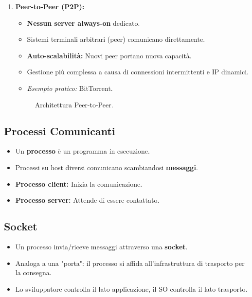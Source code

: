 \begin{enumerate}
    \item \textbf{Peer-to-Peer (P2P):}
    \begin{itemize}
        \item \textbf{Nessun server always-on} dedicato.
        \item Sistemi terminali arbitrari (peer) comunicano direttamente.
        \item \textbf{Auto-scalabilità:} Nuovi peer portano nuova capacità.
        \item Gestione più complessa a causa di connessioni intermittenti e IP dinamici.
        \item \textit{Esempio pratico:} BitTorrent.
    \end{itemize}
\begin{figure}[H]
    \centering
    \caption{Architettura Peer-to-Peer.}
\end{figure}
\end{enumerate}


\subsection{Processi Comunicanti}
\begin{itemize}
    \item Un \textbf{processo} è un programma in esecuzione.
    \item Processi su host diversi comunicano scambiandosi \textbf{messaggi}.
    \item \textbf{Processo client:} Inizia la comunicazione.
    \item \textbf{Processo server:} Attende di essere contattato.
\end{itemize}

\subsection{Socket}
\begin{itemize}
    \item Un processo invia/riceve messaggi attraverso una \textbf{socket}.
    \item Analoga a una "porta": il processo si affida all'infrastruttura di trasporto per la consegna.
    \item Lo sviluppatore controlla il lato applicazione, il SO controlla il lato trasporto.
\end{itemize}

